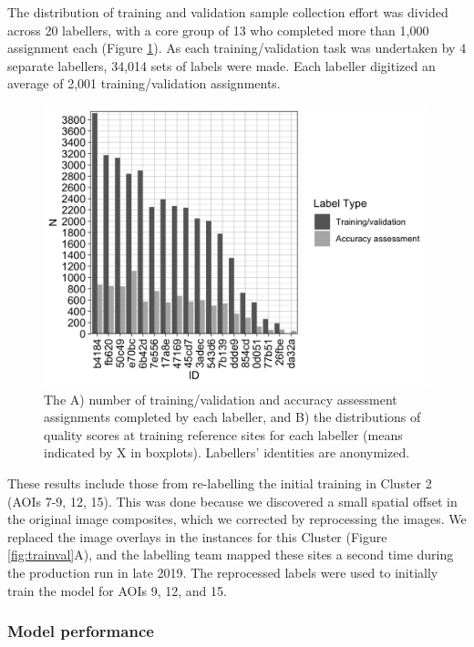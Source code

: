 \documentclass[
  11pt,
  a4paper]{article}
\begin{document}
The distribution of training and validation sample collection effort was
divided across 20 labellers, with a core group of 13 who completed more
than 1,000 assignment each (Figure \ref{fig:assignmentcount}). As each
training/validation task was undertaken by 4 separate labellers, 34,014
sets of labels were made. Each labeller digitized an average of 2,001
training/validation assignments.

\begin{figure}[!ht]

{\centering \includegraphics[width=0.8\linewidth,]{figures/si_training_n} 

}

\caption{The A) number of training/validation and accuracy assessment assignments completed by each labeller, and B) the distributions of quality scores at training reference sites for each labeller (means indicated by X in boxplots). Labellers' identities are anonymized.}\label{fig:assignmentcount}
\end{figure}

These results include those from re-labelling the initial training in
Cluster 2 (AOIs 7-9, 12, 15). This was done because we discovered a
small spatial offset in the original image composites, which we
corrected by reprocessing the images. We replaced the image overlays in
the instances for this Cluster (Figure \ref{fig:trainval}A), and the
labelling team mapped these sites a second time during the production
run in late 2019. The reprocessed labels were used to initially train
the model for AOIs 9, 12, and 15.

\hypertarget{model-performance}{%
\subsubsection{Model performance}\label{model-performance}}
\end{document}
